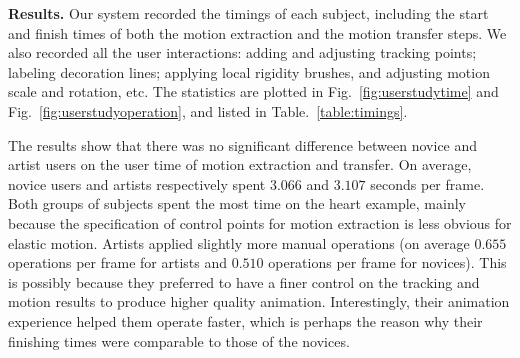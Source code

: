 

{\bf Results.} Our system recorded the timings of  each subject, including the start and finish times of both the motion extraction and the motion transfer steps. 
We also recorded all the user interactions: adding and adjusting tracking points; labeling decoration lines; applying local rigidity brushes, and adjusting motion scale and rotation, etc.
The statistics are plotted in Fig.~\ref{fig:userstudytime} and Fig.~\ref{fig:userstudyoperation}, and listed in Table.~\ref{table:timings}.

The results show that there was no significant difference between novice and artist users on the user time of motion extraction and transfer. On average, novice users and artists respectively spent $3.066$ and $3.107$ seconds per frame. Both groups of subjects spent the most time on the heart example, mainly because the specification of control points for motion extraction is less obvious for elastic motion. Artists applied slightly more manual operations (on average $0.655$ operations per frame for artists and $0.510$ operations per frame for novices). This is possibly because they preferred to have a finer control on the tracking and motion results to produce higher quality animation. Interestingly, their animation experience helped them operate faster, which is perhaps the reason why their finishing times were comparable to those of the novices.

